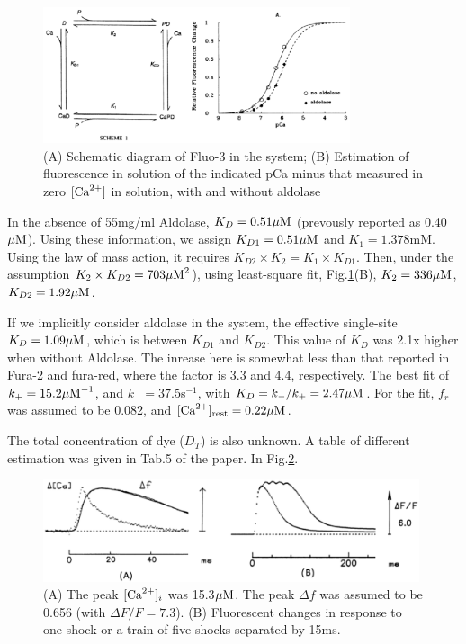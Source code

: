 \begin{figure}[hbt]
 \centerline{\includegraphics[height=4cm]{./images/Fluo3_harkins93.eps}}
\caption{(A) Schematic diagram of Fluo-3 in the system; (B) Estimation of
fluorescence in solution of the indicated pCa minus that measured in zero
$[{\text{Ca}^{2+}}]$ in solution, with and without aldolase}
\label{fig:fluo3_harkins93}
\end{figure}


In the absence of 55mg/ml Aldolase, $K_D=0.51{\mu\text{M}}$ (prevously \citep{4} reported
as 0.40${\mu\text{M}}$). Using these information, we assign $K_{D1}=0.51{\mu\text{M}}$ and
$K_{1}=1.378$mM. Using the law of mass action, it requires $K_{D2}\times K_2 =
K_1\times K_{D1}$. Then, under the assumption $K_2\times K_{D2}=703 {\mu\text{M}}^2$),
using least-square fit, Fig.\ref{fig:fluo3_harkins93}(B), $K_2=336{\mu\text{M}}$,
$K_{D2}=1.92{\mu\text{M}}$.

If we implicitly consider aldolase in the system, the effective single-site
$K_D=1.09{\mu\text{M}}$, which is between $K_{D1}$ and $K_{D2}$. This value of $K_D$ was
2.1x higher when without Aldolase. The inrease here is somewhat less than that
reported in Fura-2 and fura-red, where the factor is 3.3 and 4.4, respectively.
The best fit of $k_+=15.2 {\mu\text{M}}^{-1}$, and $k_{-}=37.5$s$^{-1}$, with
$K_D=k_-/k_+=2.47{\mu\text{M}}$. For the fit, $f_r $ was assumed to be 0.082, and
$[{\text{Ca}^{2+}}]_{\text{rest}}=0.22{\mu\text{M}}$.

The total concentration of dye ($D_T$) is also unknown. A table of different
estimation was given in Tab.5 of the paper. In
Fig.\ref{fig:fluo3_transient_harkins93}.

\begin{figure}[hbt]
 \centerline{\includegraphics[height=3cm]{./images/Fluo3_transient_harkins93.eps}}
\caption{(A) The peak $[{\text{Ca}^{2+}}]_i$ was 15.3${\mu\text{M}}$. The peak $\Delta f$ was assumed to be 0.656
(with $\Delta F/F=7.3$). (B) Fluorescent changes in response to one shock or a
train of five shocks separated by 15ms.}
\label{fig:fluo3_transient_harkins93}
\end{figure}


